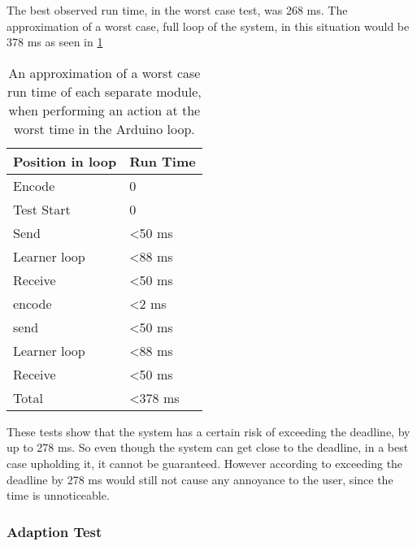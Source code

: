 The best observed run time, in the worst case test, was 268 ms. The approximation of a worst case, full loop of the system, in this situation would be 378 ms as seen in \cref{Table:WorstRunTimeAprox}

\begin{center}
	\begin{table}[htbp]
	  \centering
	  \begin{tabular}{l l}
		\toprule
		Position in loop		& Run Time  \\ \midrule
		Encode 			        & 0  	  	\\ \midrule
		Test Start		        & 0  		\\ \midrule
		Send   			        & <50 ms     \\ \midrule
		Learner loop 	        & <88 ms     \\ \midrule
		Receive 		        & <50 ms     \\ \midrule
		encode 			        & <2 ms      \\ \midrule
		send   			        & <50 ms     \\ \midrule
		Learner loop 	        & <88 ms	    \\ \midrule
		Receive 		        & <50 ms     \\ \midrule \midrule
		Total			        & <378 ms     \\
                                            \bottomrule
	  \end{tabular}
	  \caption{An approximation of a worst case run time of each separate module, when performing an action at the worst time in the Arduino loop.}\label{Table:WorstRunTimeAprox}
	\end{table}
\end{center}

These tests show that the system has a certain risk of exceeding the deadline, by up to 278 ms. So even though the system can get close to the deadline, in a best case upholding it, it cannot be guaranteed. However according to \cite{jakobnielsen} exceeding the deadline by 278 ms would still not cause any annoyance to the user, since the time is unnoticeable.

\subsubsection{Adaption Test}

